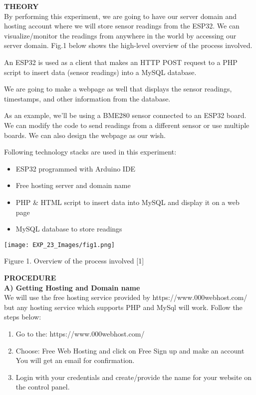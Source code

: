 \documentclass[12pt,a4paper]{article}
\begin{document}
\begin{justify}
\textbf{\large THEORY}\\[3pt]
By performing this experiment, we are going to have our server domain and hosting account where we will store sensor readings from the ESP32. We can visualize/monitor the readings from anywhere in the world by accessing our server domain. Fig.1 below shows the high-level overview of the process involved.\par
\noindent An ESP32 is used as a client that makes an HTTP POST request to a PHP script to insert data (sensor readings) into a MySQL database.\par
\noindent We are going to make a webpage as well that displays the sensor readings, timestamps, and other information from the database.\par 
\noindent As an example, we'll be using a BME280 sensor connected to an ESP32 board. We can modify the code to send readings from a different sensor or use multiple boards. We can also design the webpage as our wish.\par

\noindent Following technology stacks are used in this experiment:
\vspace{-3mm}
\begin{itemize}
\setlength\itemsep{-0.3em}
\item ESP32 programmed with Arduino IDE
\item Free hosting server and domain name
\item PHP \& HTML script to insert data into MySQL and display it on a web page
\item MySQL database to store readings
\end{itemize}


\begin{center} 
\texttt{[image: EXP\_23\_Images/fig1.png]}
\end{center}
\begin{center} {Figure 1. Overview of the process involved [1]}\end{center}

\vspace{6pt}
\noindent \textbf{\large PROCEDURE}\\[6pt]
\textbf{A) Getting Hosting and Domain name}\\[3pt]
We will use the free hosting service provided by https://www.000webhost.com/  but any hosting service which supports PHP and MySql will work. Follow the steps below:
\vspace{-3mm}
\begin{enumerate}
\setlength\itemsep{-0.3em}
\item Go to the: https://www.000webhost.com/
\item Choose: Free Web Hosting and click on Free Sign up and make an account\\
You will get an email for confirmation.
\item Login with your credentials and create/provide the name for your website on the control panel.
\end{enumerate}


\end{justify}
\end{document}
